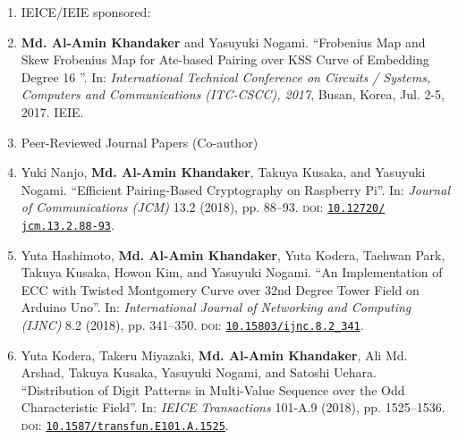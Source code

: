 \begin{enumerate}
	\vspace{5mm}
	\item[ ] \Large IEICE/IEIE sponsored:
	\normalsize
	\item \textbf{Md. Al-Amin Khandaker} and Yasuyuki Nogami. ``Frobenius Map and Skew Frobenius Map for Ate-based Pairing over KSS Curve of Embedding Degree 16 ''. In: \textit{International Technical Conference on Circuits / Systems, Computers and Communications (ITC-CSCC), 2017},  Busan, Korea, Jul. 2-5, 2017. IEIE.


\vspace{10mm}
\Large
\item[] Peer-Reviewed Journal Papers  (Co-author)
\normalsize

	\normalsize
	\item Yuki Nanjo, \textbf{Md. Al-Amin Khandaker}, Takuya Kusaka, and Yasuyuki Nogami. “Efficient Pairing-Based Cryptography on Raspberry Pi”. In: \textit{Journal of Communications (JCM)} 13.2 (2018), pp. 88–93. \textsc{doi}: \href{https://doi.org/10.12720/jcm.13.2.88-93}{\texttt{10.12720/\\jcm.13.2.88-93}}.

	\normalsize
	\item Yuta Hashimoto, \textbf{Md. Al-Amin Khandaker}, Yuta Kodera, Taehwan Park, Takuya Kusaka, Howon Kim, and Yasuyuki Nogami. ``An Implementation of ECC with Twisted Montgomery Curve over 32nd Degree Tower Field on Arduino Uno''. In: \textit{International Journal of Networking and Computing (IJNC)} 8.2 (2018), pp. 341–350. \textsc{doi}: \href{https://doi.org/10.15803/ijnc.8.2_341}{\texttt{10.15803/ijnc.8.2\_341}}.
	
	\normalsize
	\item Yuta Kodera, Takeru Miyazaki, \textbf{Md. Al-Amin Khandaker}, Ali Md. Arshad, Takuya Kusaka, Yasuyuki Nogami, and Satoshi Uehara. ``Distribution of Digit Patterns in Multi-Value Sequence over the Odd Characteristic Field''. In: \textit{IEICE Transactions} 101-A.9 (2018), pp. 1525–1536. \textsc{doi}: \href{https://doi.org/10.1587/transfun.E101.A.1525}{\texttt{10.1587/transfun.E101.A.1525}}.
	

\end{enumerate}
